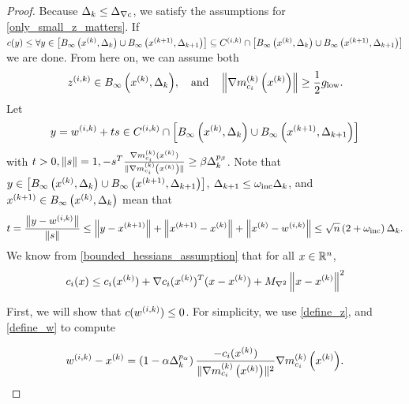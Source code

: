 \begin{proof}
Because $\dk \le \mingraddelta$, we satisfy the assumptions for \cref{only_small_z_matters}.
If $c(y) \le \forall y \in \left[\tr \cup \trkpo\right] \subseteq \fik \cap \left[\tr \cup \trkpo\right]$ we are done.
From here on, we can assume both
\begin{align}
\zik \in \tr, \quad \textrm{and} \quad \left\|\gmcik\right\| \ge \frac 1 2 \mingrad. \label{z_is_active}
\end{align}
Let
\begin{align}
y = \wik + ts \in \fik \cap \left[\tr \cup \trkpo\right] \label{t_is_bounded}
\end{align}
with $t > 0, \|s\| = 1, -s^T\hgik \ge \beta \dk^{p_{\beta}}$.
Note that $y \in \left[\tr \cup \trkpo\right]$, $\dkpo \le \omegainc\dk$, and $\xkpo \in \tr$ mean that
\begin{align}
\label{eccif_bound_t}
t = \frac{\left\|y - \wik\right\|}{\left\|s\right\|} 
\le \left\|y - \xkpo\right\| + \left\|\xkpo - \xk\right\| + \left\|\xk - \wik\right\|
\le \sqrt{n}\left(2 + \omegainc \right)\dk.
\end{align}
We know from \cref{bounded_hessians_assumption} that for all $x \in \Rn$,
\begin{align}
c_i(x) \le c_i(\xk) + \nabla c_i(\xk)^T(x - \xk) + \maxhessian \left \|x - \xk \right\|^2 \label{constraint_lower_bound}
\end{align}

First, we will show that $c(\wik) \le 0$.
For simplicity, we use \cref{define_z}, and \cref{define_w} to compute


\begin{align}
\wik - \xk = \left(1 - \alpha \dk^{p_{\alpha} }\right)\frac{-c_i(\xk)}{\|\gmcik\|^2}\gmcik. \label{simple_computation}
\end{align}


\end{proof}
